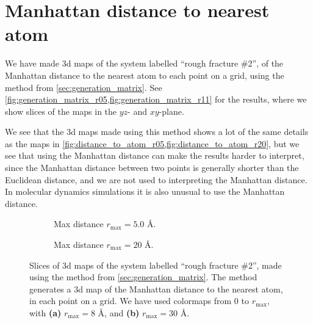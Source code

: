 \section{Manhattan distance to nearest atom}
%
We have made 3d maps of the system labelled ``rough fracture \#2'', of the Manhattan distance to the nearest atom to each point on a grid, using the method from \cref{sec:generation_matrix}. See \cref{fig:generation_matrix_r05,fig:generation_matrix_r11} for the results, where we show slices of the maps in the $yz$- and $xy$-plane.

We see that the 3d maps made using this method shows a lot of the same details as the maps in \cref{fig:distance_to_atom_r05,fig:distance_to_atom_r20}, but we see that using the Manhattan distance can make the results harder to interpret, since the Manhattan distance between two points is generally shorter than the Euclidean distance, and we are not used to interpreting the Manhattan distance. In molecular dynamics simulations it is also unusual to use the Manhattan distance.%
%
\begin{figure}[htpb]%
    \centering%
    \setlength{\myfigwidth}{0.9\textwidth}%
    \begin{subfigure}[b]{\myfigwidth}%
        \caption{Max distance $r_\text{max}=5.0$ \AA.%
        \label{fig:generation_matrix_r05}}%
    \end{subfigure}%
    \vspace{10pt}
    \begin{subfigure}[b]{\myfigwidth}%
        \caption{Max distance $r_\text{max}=20$ \AA.%
        \label{fig:generation_matrix_r11}}%
    \end{subfigure}%
    \caption{%
        Slices of 3d maps of the system labelled ``rough fracture \#2'', made using the method from \cref{sec:generation_matrix}. The method generates a 3d map of the Manhattan distance to the nearest atom, in each point on a grid. We have used colormaps from 0 to $r_\text{max}$, with \textbf{(a)} $r_\text{max} = 8$ \AA, and \textbf{(b)} $r_\text{max} = 30$ \AA.%
    }%
\end{figure}%